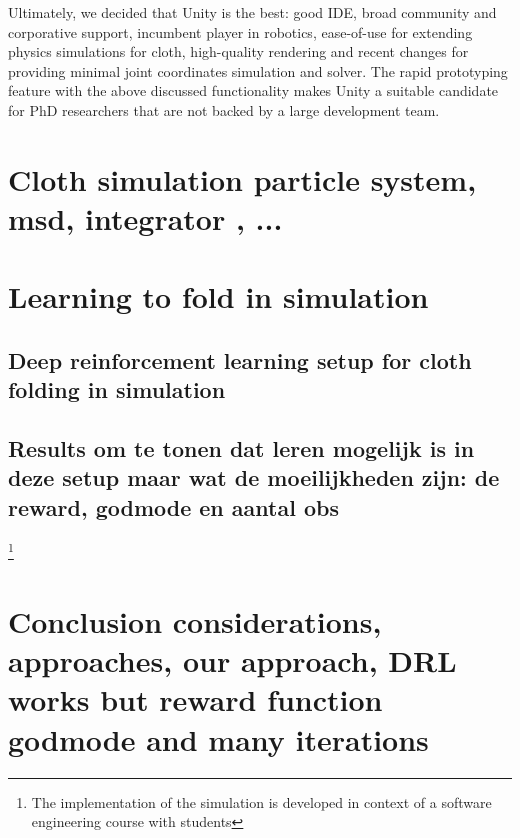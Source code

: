 \documentclass[\home/main.tex]{subfiles}
\begin{document}
Ultimately, we decided that Unity is the best: good IDE, broad community and corporative support, incumbent player in robotics, ease-of-use for extending physics simulations for cloth, high-quality rendering and recent changes for providing minimal joint coordinates simulation and solver. 
The rapid prototyping feature with the above discussed functionality makes Unity a suitable candidate for PhD researchers that are not backed by a large development team. 

\section{Cloth simulation \tiny{particle system, msd, integrator , ...} }




\section{Learning to fold in simulation}
\subsection{Deep reinforcement learning setup for cloth folding in simulation}
\subsection{Results \tiny{om te tonen dat leren mogelijk is in deze setup maar wat de moeilijkheden zijn: de reward, godmode en aantal obs}}

\footnote{The implementation of the simulation is developed in context of a software engineering course with students }


\section{Conclusion {\tiny considerations, approaches, our approach, DRL works but reward function godmode and many iterations}}

\printbibliography
\end{document}
